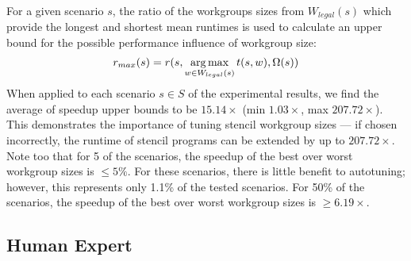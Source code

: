 For a given scenario $s$, the ratio of the workgroups sizes from
$W_{legal}(s)$ which provide the longest and shortest mean runtimes is
used to calculate an upper bound for the possible performance
influence of workgroup size:
%
\begin{equation}
r_{max}(s) = r(s, \operatorname*{arg\,max}_{w \in W_{legal}(s)} t(s,w), \Omega(s))
\end{equation}
%
When applied to each scenario $s \in S$ of the experimental results,
we find the average of speedup upper bounds to be $15.14\times$ (min
$1.03\times$, max $207.72\times$). This demonstrates the importance of
tuning stencil workgroup sizes --- if chosen incorrectly, the runtime
of stencil programs can be extended by up to $207.72\times$. Note too
that for 5 of the scenarios, the speedup of the best over worst
workgroup sizes is $\le 5\%$.
For these scenarios, there is little benefit to autotuning; however,
this represents only 1.1\% of the tested scenarios. For 50\% of the
scenarios, the speedup of the best over worst workgroup sizes is
$\ge 6.19\times$.


\subsection{Human Expert}

